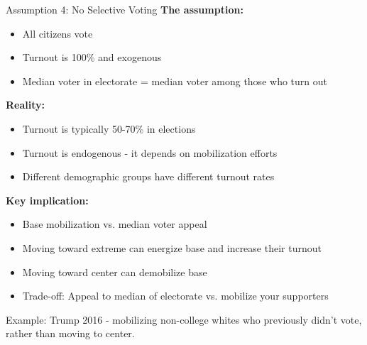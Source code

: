 \documentclass[10pt]{beamer}
\begin{document}
\begin{frame}[allowframebreaks]{Assumption 4: No Selective Voting}
\textbf{The assumption:}
\begin{itemize}
\item All citizens vote
\item Turnout is 100\% and exogenous
\item Median voter in electorate = median voter among those who turn out
\end{itemize}



\textbf{Reality:}
\begin{itemize}
\item Turnout is typically 50-70\% in elections
\item Turnout is \alert{endogenous} - it depends on mobilization efforts
\item Different demographic groups have different turnout rates
\end{itemize}

  \framebreak  

\textbf{Key implication:}
\begin{itemize}
\item \alert{Base mobilization vs. median voter appeal}
\item Moving toward extreme can energize base and increase their turnout
\item Moving toward center can demobilize base
\item Trade-off: Appeal to median of electorate vs. mobilize your supporters
\end{itemize}



\alert{Example:} Trump 2016 - mobilizing non-college whites who previously didn't vote, rather than moving to center.
\end{frame}
\end{document}
